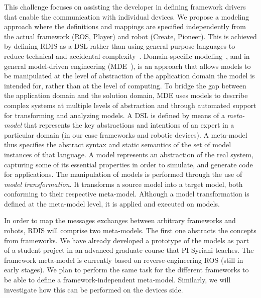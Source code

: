 This challenge focuses on assisting the developer in defining framework drivers that enable the communication with individual devices.
We propose a modeling approach where the definitions and mappings are specified independently from the actual framework (\eg ROS, Player) and robot (\eg Create, Pioneer).
This is achieved by defining RDIS as a DSL rather than using general purpose languages to reduce technical and accidental complexity~\cite{Brooks1987}.
Domain-specific modeling~\cite{Kelly2008}, and in general model-driven engineering (MDE~\cite{Stahl2006}), is an approach that allows models to be manipulated at the level of abstraction of the application domain the model is intended for, rather than at the level of computing.
To bridge the gap between the application domain and the solution domain, MDE uses models to describe complex systems at multiple levels of abstraction and through automated support for transforming and analyzing models.
A DSL is defined by means of a \emph{meta-model} that represents the key abstractions and intentions of an expert in a particular domain (in our case frameworks and robotic devices).
A meta-model thus specifies the abstract syntax and static semantics of the set of model instances of that language.
A model represents an abstraction of the real system, capturing some of its essential properties in order to simulate, and generate code for applications.
The manipulation of models is performed through the use of \emph{model transformation}.
It transforms a source model into a target model, both conforming to their respective meta-model.
Although a model transformation is defined at the meta-model level, it is applied and executed on models.

In order to map the messages exchanges between arbitrary frameworks and robots, RDIS will comprise two meta-models.
The first one abstracts the concepts from frameworks.
We have already developed a prototype of the models as part of a student project in an advanced graduate course that PI Syriani teaches.
The framework meta-model is currently based on reverse-engineering ROS (still in early stages).
We plan to perform the same task for the different frameworks to be able to define a framework-independent meta-model.
Similarly, we will investigate how this can be performed on the devices side.

